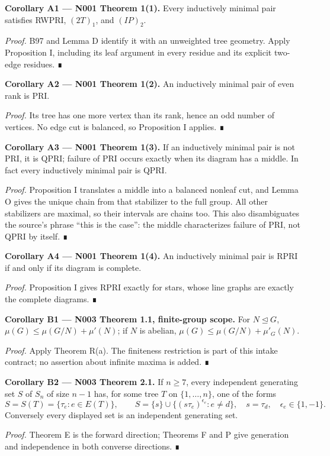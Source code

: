 \documentclass[
  10pt,
  letterpaper,
]{article}
\begin{document}
\textbf{Corollary A1 --- N001 Theorem 1(1).} Every inductively minimal
pair satisfies RWPRI, \((2T)_1\), and \((IP)_2\).

\emph{Proof.} B97 and Lemma D identify it with an unweighted tree
geometry. Apply Proposition I, including its leaf argument in every
residue and its explicit two-edge residues. ∎

\textbf{Corollary A2 --- N001 Theorem 1(2).} An inductively minimal pair
of even rank is PRI.

\emph{Proof.} Its tree has one more vertex than its rank, hence an odd
number of vertices. No edge cut is balanced, so Proposition I applies. ∎

\textbf{Corollary A3 --- N001 Theorem 1(3).} If an inductively minimal
pair is not PRI, it is QPRI; failure of PRI occurs exactly when its
diagram has a middle. In fact every inductively minimal pair is QPRI.

\emph{Proof.} Proposition I translates a middle into a balanced nonleaf
cut, and Lemma O gives the unique chain from that stabilizer to the full
group. All other stabilizers are maximal, so their intervals are chains
too. This also disambiguates the source's phrase ``this is the case'':
the middle characterizes failure of PRI, not QPRI by itself. ∎

\textbf{Corollary A4 --- N001 Theorem 1(4).} An inductively minimal pair
is RPRI if and only if its diagram is complete.

\emph{Proof.} Proposition I gives RPRI exactly for stars, whose line
graphs are exactly the complete diagrams. ∎

\textbf{Corollary B1 --- N003 Theorem 1.1, finite-group scope.} For
\(N\unlhd G\), \(\mu(G)\leq\mu(G/N)+\mu'(N)\); if \(N\) is abelian,
\(\mu(G)\leq\mu(G/N)+\mu'_G(N)\).

\emph{Proof.} Apply Theorem R(a). The finiteness restriction is part of
this intake contract; no assertion about infinite maxima is added. ∎

\textbf{Corollary B2 --- N003 Theorem 2.1.} If \(n\geq7\), every
independent generating set \(S\) of \(S_n\) of size \(n-1\) has, for
some tree \(T\) on \(\{1,\ldots,n\}\), one of the forms \[
S=S(T)=\{\tau_e:e\in E(T)\},\qquad
S=\{s\}\cup\{(s\tau_e)^{\epsilon_e}:e\ne d\},
\quad s=\tau_d,\quad\epsilon_e\in\{1,-1\}.
\] Conversely every displayed set is an independent generating set.

\emph{Proof.} Theorem E is the forward direction; Theorems F and P give
generation and independence in both converse directions. ∎
\end{document}
